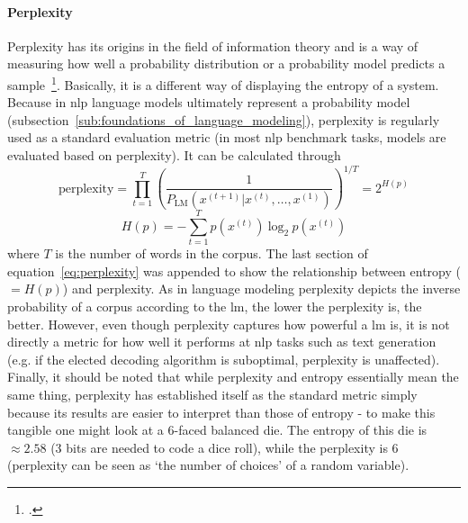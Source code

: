\paragraph{Perplexity}
Perplexity has its origins in the field of information theory and is a way of measuring how well a probability distribution or a probability model predicts a sample~\footcite{10.2307/24980838}. Basically, it is a different way of displaying the entropy of a system. Because in \gls{nlp} language models ultimately represent a probability model (subsection~\ref{sub:foundations_of_language_modeling}), perplexity is regularly used as a standard evaluation metric (in most \gls{nlp} benchmark tasks, models are evaluated based on perplexity). It can be calculated through
\begin{equation}
	\label{eq:perplexity}
	\text{perplexity} = \prod_{t=1}^{T} \left( \frac{1}{P_{\text{LM}}(x^{(t+1)} | x^{(t)}, \dots, x^{(1)})} \right)^{1/T} = 2^{H(p)}
\end{equation}
\begin{equation}
	H(p) = - \sum_{t=1}^{T} p(x^{(t)}) \ \text{log}_2 \ p(x^{(t)})
\end{equation}
where $ T $ is the number of words in the corpus. The last section of equation~\ref{eq:perplexity} was appended to show the relationship between entropy ($ = H(p) $) and perplexity. As in language modeling perplexity depicts the inverse probability of a corpus according to the \gls{lm}, the lower the perplexity is, the better. However, even though perplexity captures how powerful a \gls{lm} is, it is not directly a metric for how well it performs at \gls{nlp} tasks such as text generation (e.g. if the elected decoding algorithm is suboptimal, perplexity is unaffected). Finally, it should be noted that while perplexity and entropy essentially mean the same thing, perplexity has established itself as the standard metric simply because its results are easier to interpret than those of entropy - to make this tangible one might look at a 6-faced balanced die. The entropy of this die is $ \approx 2.58 $ (3 bits are needed to code a dice roll), while the perplexity is $ 6 $ (perplexity can be seen as `the number of choices' of a random variable).

